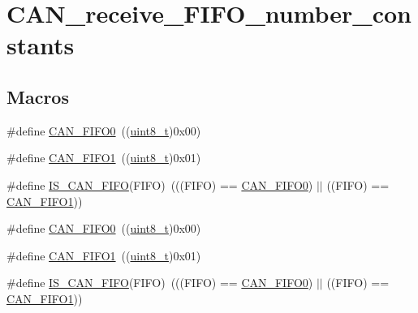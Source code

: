 \hypertarget{group___c_a_n__receive___f_i_f_o__number__constants}{}\section{C\+A\+N\+\_\+receive\+\_\+\+F\+I\+F\+O\+\_\+number\+\_\+constants}
\label{group___c_a_n__receive___f_i_f_o__number__constants}
\subsection*{Macros}
\begin{DoxyCompactItemize}
\item 
\#define \hyperlink{group___c_a_n__receive___f_i_f_o__number__constants_ga8f52eeefb86b2af5b7c3b4b75fa4d114}{C\+A\+N\+\_\+\+F\+I\+F\+O0}~((\hyperlink{_p_e___types_8h_aba7bc1797add20fe3efdf37ced1182c5}{uint8\+\_\+t})0x00)
\item 
\#define \hyperlink{group___c_a_n__receive___f_i_f_o__number__constants_gafbcf3f13dbf61030ab7a812595ba9850}{C\+A\+N\+\_\+\+F\+I\+F\+O1}~((\hyperlink{_p_e___types_8h_aba7bc1797add20fe3efdf37ced1182c5}{uint8\+\_\+t})0x01)
\item 
\#define \hyperlink{group___c_a_n__receive___f_i_f_o__number__constants_gaeeb94bf58bd48b8928f964eaaa20a24a}{I\+S\+\_\+\+C\+A\+N\+\_\+\+F\+I\+FO}(F\+I\+FO)~(((F\+I\+FO) == \hyperlink{openmotestm_2library_2inc_2stm32f10x__can_8h_a8f52eeefb86b2af5b7c3b4b75fa4d114}{C\+A\+N\+\_\+\+F\+I\+F\+O0}) $\vert$$\vert$ ((F\+I\+FO) == \hyperlink{openmotestm_2library_2inc_2stm32f10x__can_8h_afbcf3f13dbf61030ab7a812595ba9850}{C\+A\+N\+\_\+\+F\+I\+F\+O1}))
\item 
\#define \hyperlink{group___c_a_n__receive___f_i_f_o__number__constants_ga8f52eeefb86b2af5b7c3b4b75fa4d114}{C\+A\+N\+\_\+\+F\+I\+F\+O0}~((\hyperlink{_p_e___types_8h_aba7bc1797add20fe3efdf37ced1182c5}{uint8\+\_\+t})0x00)
\item 
\#define \hyperlink{group___c_a_n__receive___f_i_f_o__number__constants_gafbcf3f13dbf61030ab7a812595ba9850}{C\+A\+N\+\_\+\+F\+I\+F\+O1}~((\hyperlink{_p_e___types_8h_aba7bc1797add20fe3efdf37ced1182c5}{uint8\+\_\+t})0x01)
\item 
\#define \hyperlink{group___c_a_n__receive___f_i_f_o__number__constants_gaeeb94bf58bd48b8928f964eaaa20a24a}{I\+S\+\_\+\+C\+A\+N\+\_\+\+F\+I\+FO}(F\+I\+FO)~(((F\+I\+FO) == \hyperlink{openmotestm_2library_2inc_2stm32f10x__can_8h_a8f52eeefb86b2af5b7c3b4b75fa4d114}{C\+A\+N\+\_\+\+F\+I\+F\+O0}) $\vert$$\vert$ ((F\+I\+FO) == \hyperlink{openmotestm_2library_2inc_2stm32f10x__can_8h_afbcf3f13dbf61030ab7a812595ba9850}{C\+A\+N\+\_\+\+F\+I\+F\+O1}))
\end{DoxyCompactItemize}


